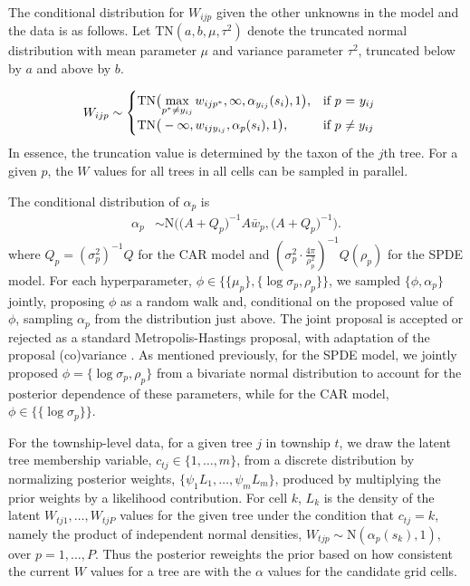 \documentclass[12pt]{article}\usepackage[]{graphicx}\usepackage[]{color}
\begin{document}
The conditional distribution for $W_{ijp}$ given the other unknowns
in the model and the data is as follows. Let $\mbox{TN}(a,b,\mu,\tau^{2})$
denote the truncated normal distribution with mean parameter $\mu$
and variance parameter $\tau^{2}$, truncated below by $a$ and above
by $b$. 

\begin{align}
W_{ijp} & \sim\begin{cases}
\mbox{TN}\big({\displaystyle \max_{p^{*}\neq y_{ij}}w_{ijp^{*}},\infty,\alpha_{y_{ij}}(s_{i}),1\big),} & \mbox{if }p\mbox{ = \ensuremath{y_{ij}}}\\
\mbox{TN}\big(-\infty,w_{ijy_{ij}},\alpha_{p}(s_{i}),1\big), & \mbox{if }p\mbox{ \ensuremath{\neq y_{ij}}}
\end{cases}\label{sampW}
\end{align}
In essence, the truncation value is determined by the taxon of the
$j$th tree. For a given $p$, the $W$ values for all trees in all
cells can be sampled in parallel. 

The conditional distribution of $\alpha_{p}$ is 
\begin{align}
\alpha_{p} & \sim\mbox{N}\bigg(\Big(A+Q_{p}\Big)^{-1}A\bar{w}_{p},\Big(A+Q_{p}\Big)^{-1}\bigg).\label{sampalpha}
\end{align}
where $Q_{p}=(\sigma_{p}^{2})^{-1}Q$ for the CAR model and $\left(\sigma_{p}^{2}\cdot\frac{4\pi}{\rho_{p}^{2}}\right)^{-1}Q(\rho_{p})$
for the SPDE model. For each hyperparameter, $\phi\in\{\{\mu_{p}\},\{\log\sigma_{p},\rho_{p}\}\}$,
we sampled $\{\phi,\alpha_{p}\}$ jointly, proposing $\phi$ as a
random walk and, conditional on the proposed value of $\phi$, sampling
$\alpha_{p}$ from the distribution just above. The joint proposal
is accepted or rejected as a standard Metropolis-Hastings proposal,
with adaptation of the proposal (co)variance \citep{Shab:Well:2011}.
As mentioned previously, for the SPDE model, we jointly proposed $\phi=\{\log\sigma_{p},\rho_{p}\}$
from a bivariate normal distribution to account for the posterior
dependence of these parameters, while for the CAR model, $\phi\in\{\{\log\sigma_{p}\}\}$. 

\noindent 

For the township-level data, for a given tree $j$ in township $t$,
we draw the latent tree membership variable, $c_{tj}\in\{1,\ldots,m\}$,
from a discrete distribution by normalizing posterior weights, $\{\psi_{1}L_{1},\ldots,\psi_{m}L_{m}\}$,
produced by multiplying the prior weights by a likelihood contribution.
For cell $k$, $L_{k}$ is the density of the latent $W_{tj1},\ldots,W_{tjP}$
values for the given tree under the condition that $c_{tj}=k$, namely
the product of independent normal densities, $W_{tjp}\sim\mbox{N}(\alpha_{p}(s_{k}),1)$,
over $p=1,\ldots,P$. Thus the posterior reweights the prior based
on how consistent the current $W$ values for a tree are with the
$\alpha$ values for the candidate grid cells. 
\end{document}
